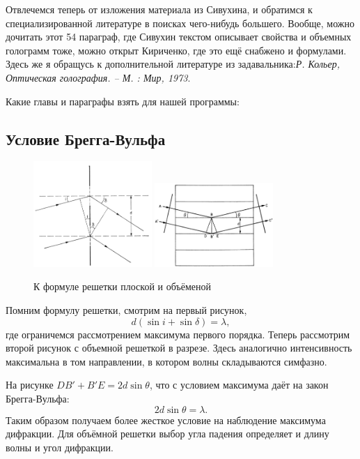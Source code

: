 Отвлечемся теперь от изложения материала из Сивухина, и обратимся к специализированной литературе в поисках чего-нибудь большего.
Вообще, можно дочитать этот 54 параграф, где Сивухин текстом описывает свойства и объемных голограмм тоже, можно открыт Кириченко, где это ещё снабжено и формулами. 
Здесь же я обращусь к дополнительной литературе из задавальника:\textit{Р. Кольер, Оптическая голография. – М. : Мир, 1973}.

Какие главы и параграфы взять для нашей программы:

\subsection{Условие Брегга-Вульфа}
\begin{figure}[ht]
    \centering
    \includegraphics[width=0.4\textwidth]{figures/10_add_reshetka.png}
    \hspace{5 mm} 
    \includegraphics[width=0.4\textwidth]{figures/10_add_bregg.png}
    \caption{К формуле решетки плоской и объёменой}
    \label{fig:10_add}
\end{figure}

Помним формулу решетки, смотрим на первый рисунок, 
\begin{equation*}
	d (\sin i + \sin \delta) = \lambda,
\end{equation*}
 где ограничемся рассмотрением максимума первого порядка. 
Теперь рассмотрим второй рисунок с объемной решеткой в разрезе.
Здесь аналогично интенсивность максимальна в том направлении, в котором волны складываются симфазно.

На рисунке $DB' + B'E = 2 d \sin \theta$, что с условием максимума даёт на закон Брегга-Вульфа:
\begin{equation*}
	2 d \sin \theta = \lambda.
\end{equation*}
Таким образом получаем более жесткое условие на наблюдение максимума дифракции.
Для объёмной решетки выбор угла падения определяет и длину волны и угол дифракции. 